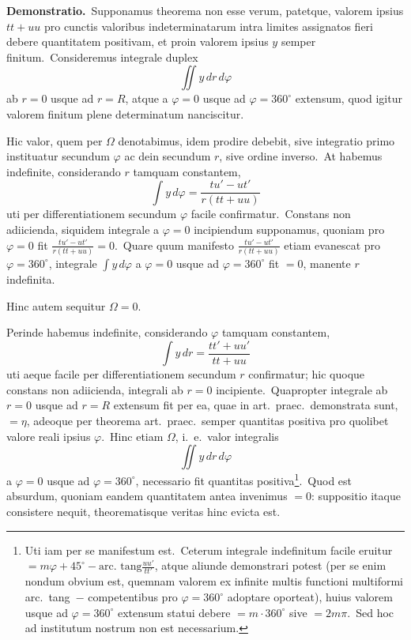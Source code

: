 \documentclass[12pt,a4paper]{article}
\theoremstyle{plain}
\begin{document}
\textbf{Demonstratio.}\ Supponamus theorema non esse verum, patetque, valorem
ipsius $tt + uu$ pro cunctis valoribus indeterminatarum intra limites assignatos
fieri debere quantitatem positivam, et proin valorem ipsius $y$ semper finitum.\ Consideremus integrale duplex
\[
\iint y\, dr\, d\varphi
\]
ab $r = 0$ usque ad $r = R$, atque a $\varphi = 0$ usque ad $\varphi = 360^\circ$ extensum,
quod igitur valorem finitum plene determinatum nanciscitur.

Hic valor, quem per $\Omega$ denotabimus, idem prodire debebit, sive integratio primo instituatur secundum $\varphi$ ac dein secundum $r$, sive ordine inverso.\ At habemus indefinite, considerando $r$ tamquam constantem,
\[
\int y\, d\varphi = \frac{tu' - ut'}{r(tt + uu)}
\]
uti per differentiationem secundum $\varphi$ facile confirmatur.\ Constans non adiicienda, siquidem integrale a $\varphi = 0$ incipiendum supponamus, quoniam pro
$\varphi = 0$ fit $\frac{tu' - ut'}{r(tt + uu)} = 0$.\ Quare quum manifesto $\frac{tu' - ut'}{r(tt + uu)}$ etiam evanescat pro
$\varphi = 360^\circ$, integrale $\int y\, d\varphi$ a $\varphi = 0$ usque ad $\varphi = 360^\circ$ fit $= 0$, manente $r$
indefinita.

Hinc autem sequitur $\Omega = 0$.

Perinde habemus indefinite, considerando $\varphi$ tamquam constantem,
\[
\int y\, dr = \frac{tt' + uu'}{tt + uu}
\]
uti aeque facile per differentiationem secundum $r$ confirmatur; hic quoque constans non adiicienda, integrali ab $r = 0$ incipiente.\ Quapropter integrale ab
$r = 0$ usque ad $r = R$ extensum fit per ea, quae in art.\ praec.\ demonstrata sunt,
$= \eta$, adeoque per theorema art.\ praec.\ semper quantitas positiva pro quolibet valore reali ipsius $\varphi$.\ Hinc etiam $\Omega$, i.\ e.\ valor integralis
\[
\iint y\, dr\, d\varphi
\]
a $\varphi = 0$ usque ad $\varphi = 360^\circ$, necessario fit quantitas positiva\footnote{Uti iam per se manifestum est.\ Ceterum integrale indefinitum facile eruitur $= m\varphi + 45^\circ - \text{arc.\ tang}\frac{uu'}{tt'}$,
atque aliunde demonstrari potest (per se enim nondum obvium est, quemnam valorem ex infinite multis functioni
multiformi arc.\ tang\ $-$ competentibus pro $\varphi = 360^\circ$ adoptare oporteat), huius valorem usque ad $\varphi = 360^\circ$
extensum statui debere $= m \cdot 360^\circ$ sive $= 2m\pi$.\ Sed hoc ad institutum nostrum non est necessarium.}.\ Quod est absurdum, quoniam eandem quantitatem antea invenimus $= 0$: suppositio itaque
consistere nequit, theorematisque veritas hinc evicta est.
\end{document}

